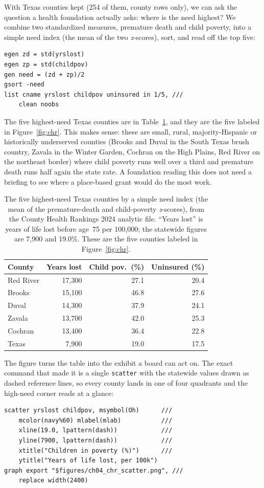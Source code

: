 \documentclass[
    a4paper,
    fontsize=10pt,
    twoside=true,
    numbers=noenddot,
]{kaobook}
\begin{document}
With Texas counties kept (254 of them, county rows only), we can ask the question a health foundation actually asks: where is the need highest? We combine two standardized measures, premature death and child poverty, into a simple need index (the mean of the two \emph{z}-scores), sort, and read off the top five:
{\footnotesize
\begin{verbatim}
egen zd = std(yrslost)
egen zp = std(childpov)
gen need = (zd + zp)/2
gsort -need
list cname yrslost childpov uninsured in 1/5, ///
    clean noobs
\end{verbatim}
}
The five highest-need Texas counties are in Table~\ref{tab:chr}, and they are the five labeled in Figure~\ref{fig:chr}. This makes sense: these are small, rural, majority-Hispanic or historically underserved counties (Brooks and Duval in the South Texas brush country, Zavala in the Winter Garden, Cochran on the High Plains, Red River on the northeast border) where child poverty runs well over a third and premature death runs half again the state rate. A foundation reading this does not need a briefing to see where a place-based grant would do the most work.

\begin{table}[htbp]
\centering
\caption[Five highest-need Texas counties]{The five highest-need Texas counties by a simple need index (the mean of the premature-death and child-poverty \emph{z}-scores), from the County Health Rankings 2024 analytic file. \enquote{Years lost} is years of life lost before age~75 per 100{,}000; the statewide figures are 7{,}900 and 19.0\%. These are the five counties labeled in Figure~\ref{fig:chr}.}
\label{tab:chr}
\begin{tabular}{lrrr}
\hline
County & Years lost & Child pov.\ (\%) & Uninsured (\%) \\
\hline
Red River & 17{,}300 & 27.1 & 20.4 \\
Brooks    & 15{,}100 & 46.8 & 27.6 \\
Duval     & 14{,}300 & 37.9 & 24.1 \\
Zavala    & 13{,}700 & 42.0 & 25.3 \\
Cochran   & 13{,}400 & 36.4 & 22.8 \\
\hline
Texas     &  7{,}900 & 19.0 & 17.5 \\
\hline
\end{tabular}
\end{table}

The figure turns the table into the exhibit a board can act on. The exact command that made it is a single \texttt{scatter} with the statewide values drawn as dashed reference lines, so every county lands in one of four quadrants and the high-need corner reads at a glance:
{\footnotesize
\begin{verbatim}
scatter yrslost childpov, msymbol(Oh)      ///
    mcolor(navy%60) mlabel(mlab)           ///
    xline(19.0, lpattern(dash))            ///
    yline(7900, lpattern(dash))            ///
    xtitle("Children in poverty (%)")      ///
    ytitle("Years of life lost, per 100k")
graph export "$figures/ch04_chr_scatter.png", ///
    replace width(2400)
\end{verbatim}
}
\end{document}
